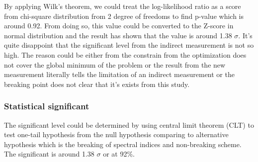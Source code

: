 By applying Wilk's theorem, we could treat the log-likelihood ratio 
as a score from chi-square distribution from 2 degree of freedoms
to find p-value which is around 0.92.
From doing so, this value could be converted to the Z-score
in normal distribution and the result has shown that the
value is around 1.38 $\sigma$. It's quite disappoint that the 
significant level from the indirect measurement is not so high.
The reason could be either from the constrain from the optimization
does not cover the global minimum of the problem or the 
result from the new measurement literally tells the limitation of
an indirect measurement or the breaking point does not clear that it's exists from this study.

\subsubsection*{Statistical significant}

The significant level could be determined by using 
central limit theorem (CLT) to test one-tail hypothesis 
from the null hypothesis comparing to alternative hypothesis
which is the breaking of spectral indices and non-breaking scheme.
The significant is around 1.38 $\sigma$ or at 92\%.



